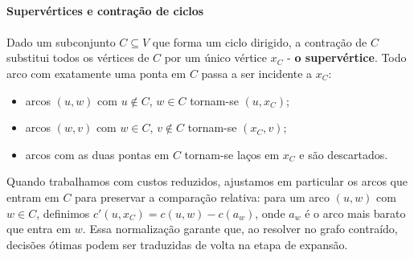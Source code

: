 \documentclass[12pt,a4paper]{article}
\def\emph#1{#1}%
\begin{document}
\paragraph{Supervértices e contração de ciclos}

\paragraph{}
Dado um subconjunto \(C\subseteq V\) que forma um ciclo dirigido, a \emph{contração de \(C\)} substitui todos os vértices de \(C\) por um único vértice \(x_C\) - \textbf{o supervértice}. Todo arco com exatamente uma ponta em \(C\) passa a ser incidente a \(x_C\):
\begin{itemize}\setlength{\itemsep}{2pt}
    \item arcos \((u,w)\) com \(u\notin C\), \(w\in C\) tornam-se \((u, x_C)\);
    \item arcos \((w,v)\) com \(w\in C\), \(v\notin C\) tornam-se \((x_C, v)\);
    \item arcos com as duas pontas em \(C\) tornam-se laços em \(x_C\) e são descartados.
\end{itemize}
Quando trabalhamos com \emph{custos reduzidos}, ajustamos em particular os arcos que \emph{entram} em \(C\) para preservar a comparação relativa: para um arco \((u,w)\) com \(w\in C\), definimos \(c'(u,x_C) = c(u,w) - c(a_w)\), onde \(a_w\) é o arco mais barato que entra em \(w\). Essa normalização garante que, ao resolver no grafo contraído, decisões ótimas podem ser traduzidas de volta na etapa de expansão.
\end{document}
